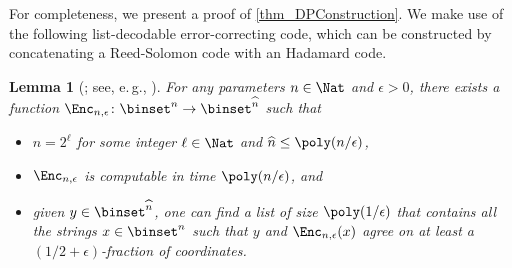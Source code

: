 \documentclass[11pt]{article}
\numberwithin{equation}{section}
\newtheorem{lemma}[theorem]{Lemma}
\theoremstyle{definition}
\theoremstyle{plain}
\newcommand{\eg}{e.\,g.}
\begin{document}
For completeness, we present a proof of \cref{thm_DPConstruction}.
We make use of the following list-decodable error-correcting code,
which can be constructed by concatenating a Reed-Solomon code with an Hadamard code.
\begin{lemma}
  [\cite{Sudan97_jc_journals}; see, \eg, \cite{Vadhan12_fttcs_journals}]
  \label{lemma_ListDecodable}
  For any parameters $n \in \Nat$ and $\epsilon > 0$,
  there exists a function $\Enc_{n, \epsilon} \colon \binset^n \to \binset^{\widehat{n}}$ such that
  \begin{itemize}
    \item
          $\widehat{n} = 2^\ell$ for some integer $\ell \in \Nat$ and $\widehat{n} \le \poly(n / \epsilon)$,
    \item
          $\Enc_{n, \epsilon}$ is computable in time $\poly(n / \epsilon)$, and
    \item
          given $y \in \binset^{\widehat{n}}$,
          one can find a list of size $\poly(1 / \epsilon)$
          that contains all the strings $x \in \binset^n$ such that $y$ and $\Enc_{n, \epsilon}(x)$ agree on at least a $(1 / 2 + \epsilon)$-fraction of coordinates.
  \end{itemize}
\end{lemma}
\end{document}

